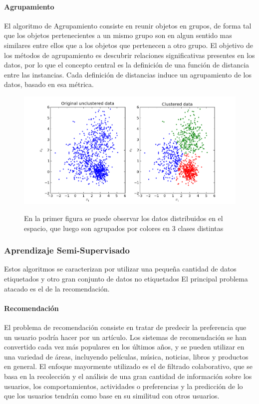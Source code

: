 \documentclass[a4paper,11pt,spanish]{book}
\begin{document}
	\paragraph {Agrupamiento}
	   El algoritmo de Agrupamiento consiste en reunir objetos en grupos, de forma tal que los objetos pertenecientes a un mismo grupo son en algun sentido mas similares
	   entre ellos que a los objetos que pertenecen a otro grupo. El objetivo de los métodos de agrupamiento es descubrir relaciones significativas presentes en los datos, por lo
	   que el concepto central es la definición de una función de distancia entre las instancias. Cada definición de distancias induce un agrupamiento de los datos, basado en esa métrica.

	  \begin{figure}[h]
	    \includegraphics[scale=0.5]{./img/stackoverflow_clustering.png}\\
	    \caption{En la primer figura se puede observar los datos distribuidos en el espacio, que luego son agrupados por colores en 3 clases distintas}
	    \label{fig:clustering}
	  \end{figure}

      \subsubsection{Aprendizaje Semi-Supervisado}
	Estos algoritmos se caracterizan por utilizar una pequeña cantidad de datos etiquetados y otro gran conjunto de datos no etiquetados
	El principal problema atacado es el de la recomendación.
	\paragraph{Recomendación}
	  El problema de recomendación consiste en tratar de predecir la preferencia que un usuario podría hacer por un artículo. Los sistemas de recomendación se han convertido cada
	  vez más populares en los últimos años, y se pueden utilizar en una variedad de áreas, incluyendo películas, música, noticias, libros y productos en general.
	  El enfoque mayormente utilizado es el de filtrado colaborativo, que se basa en la recolección y el análisis de una gran cantidad de información sobre los usuarios,
	  los comportamientos, actividades o preferencias y la predicción de lo que los usuarios tendrán como base en su similitud con otros usuarios.
	  
\end{document}
